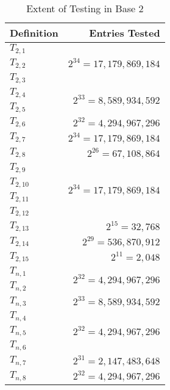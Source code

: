 \documentclass[conference]{IEEEtran}
\begin{document}
\renewcommand{\arraystretch}{1.25}
\begin{table}[H]
\label{tab:testing_b2}
\caption{Extent of Testing in Base 2}
\centering
\begin{tabular}{|l|r|}
\hline
\textbf{Definition} & \textbf{Entries Tested}      \\ \hline
$T_{2,1}$  &\multirow{3}{*}{$2^{34}=17,179,869,184$}\\ \cline{1-1}
$T_{2,2}$  &                              \\ \cline{1-1}
$T_{2,3}$  &                              \\ \hline
$T_{2,4}$  &\multirow{2}{*}{$2^{33}=8,589,934,592$}\\ \cline{1-1}
$T_{2,5}$  &                              \\ \hline
$T_{2,6}$  & $2^{32} = 4,294,967,296$     \\ \hline
$T_{2,7}$  & $2^{34} = 17,179,869,184$    \\ \hline
$T_{2,8}$  & $2^{26} = 67,108,864$        \\ \hline
$T_{2,9}$  &\multirow{4}{*}{$2^{34}=17,179,869,184$}\\ \cline{1-1}
$T_{2,10}$ &                              \\ \cline{1-1}
$T_{2,11}$ &                              \\ \cline{1-1}
$T_{2,12}$ &                              \\ \hline
$T_{2,13}$ & $2^{15} = 32,768$            \\ \hline
$T_{2,14}$ & $2^{29} = 536,870,912$       \\ \hline
$T_{2,15}$ & $2^{11} = 2,048$             \\ \hline
$T_{n,1}$  &\multirow{2}{*}{$2^{32}=4,294,967,296$}\\ \cline{1-1}
$T_{n,2}$  &                              \\ \hline
$T_{n,3}$  & $2^{33} = 8,589,934,592$     \\ \hline
$T_{n,4}$  &\multirow{3}{*}{$2^{32}=4,294,967,296$}\\ \cline{1-1}
$T_{n,5}$  &                              \\ \cline{1-1}
$T_{n,6}$  &                              \\ \hline
$T_{n,7}$  & $2^{31} = 2,147,483,648$     \\ \hline
$T_{n,8}$  & $2^{32} = 4,294,967,296$     \\ \hline
\end{tabular}
\end{table}
\end{document}
